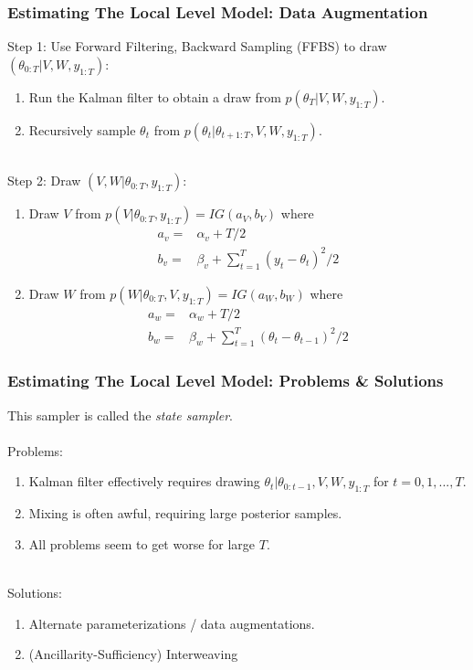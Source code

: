 \documentclass[xcolor=dvipsnames]{beamer}
\begin{document}
\begin{frame}
  \frametitle{Estimating The Local Level Model: Data Augmentation}
Step 1: Use Forward Filtering, Backward Sampling (FFBS) to draw $(\theta_{0:T}|V,W,y_{1:T})$:
\begin{enumerate}
  \item Run the Kalman filter to obtain a draw from $p(\theta_T|V, W, y_{1:T})$.
  \item Recursively sample $\theta_t$ from $p(\theta_t|\theta_{t+1:T}, V, W, y_{1:T})$.\\~\\
\end{enumerate}
\pause
Step 2: Draw $(V,W|\theta_{0:T},y_{1:T})$:
\begin{enumerate}
  \item Draw $V$ from $p(V|\theta_{0:T}, y_{1:T})=IG(a_V, b_V)$ where
    \begin{align*}
      a_v =& \alpha_v + T/2\\
      b_v = & \beta_v + \textstyle\sum_{t=1}^T(y_t-\theta_t)^2/2
    \end{align*}
  \item Draw $W$ from $p(W|\theta_{0:T}, V, y_{1:T})=IG(a_W, b_W)$ where
    \begin{align*}
      a_w =& \alpha_w + T/2\\
      b_w = & \beta_w + \textstyle\sum_{t=1}^T(\theta_t-\theta_{t-1})^2/2
    \end{align*}
\end{enumerate}

\end{frame}

\begin{frame}
  \frametitle{Estimating The Local Level Model: Problems \& Solutions}
  This sampler is called the {\it \color{red} state sampler}.\\~\\
Problems:
\begin{enumerate}
  \item Kalman filter effectively requires drawing $\theta_t|\theta_{0:t-1},V,W,y_{1:T}$ for $t=0,1,...,T$. 
  \item Mixing is often awful, requiring large posterior samples. 
  \item All problems seem to get worse for large $T$.\\~\\
\end{enumerate}
\pause

Solutions:
\begin{enumerate}
  \item Alternate parameterizations / data augmentations. 
  \item (Ancillarity-Sufficiency) Interweaving
\end{enumerate}
\end{frame}
\end{document}

